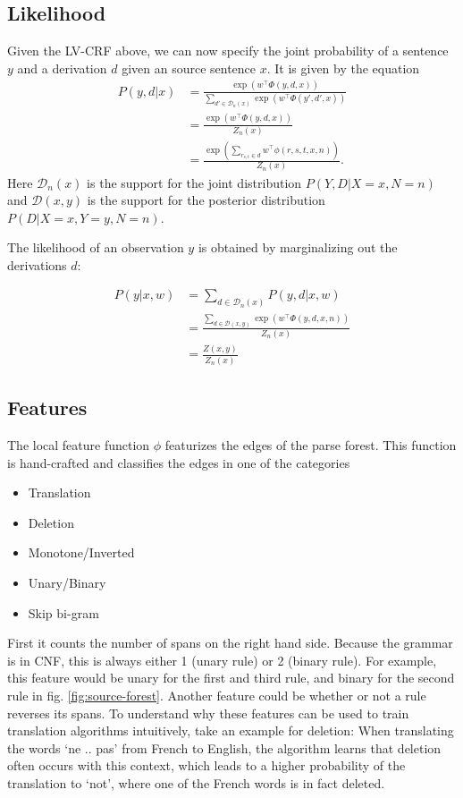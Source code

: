 \documentclass[11pt,a4paper]{article}
\begin{document}
\subsection{Likelihood}
\label{sec:model}

Given the LV-CRF above, we can now specify the joint probability of a sentence $y$ and a derivation $d$ given an source sentence $x$. It is given by the equation
\begin{align*}
\label{eq:likelihood}
P(y,d|x) 
    &= \frac{\exp(w^\top \Phi(y, d, x))}{\sum_{d' \in \mathcal D_n(x)} \exp(w^\top \Phi(y', d', x))}\\
    &= \frac{\exp(w^\top \Phi(y, d, x))}{Z_n(x)} \\
    &= \frac{\exp \left( \sum_{r_{s,t} \in d} w^\top \phi(r, s, t, x, n) \right)}{Z_n(x)}.
\end{align*}
Here $\mathcal{D}_n(x)$ is the support for the joint distribution $P(Y, D|X=x, N=n)$ and $\mathcal{D}(x, y)$ is the support for the posterior distribution $P(D|X=x, Y=y, N=n)$.

The likelihood of an observation $y$ is obtained by marginalizing out the derivations $d$:


\begin{align}
P(y | x, w) 
    &= \sum_{d \in \mathcal{D}_n(x)} P(y, d | x, w) \nonumber  \\
    &= \frac{\sum_{d \in \mathcal D(x, y)} \exp(w^\top \Phi(y, d, x, n))}{Z_n(x)} \nonumber \\
\label{eq:log-likelihood2}
    &= \frac{Z(x, y)}{Z_n(x)}
\end{align}

\subsection{Features}

The local feature function $\phi$ featurizes the edges of the parse forest. This function is hand-crafted and classifies the edges in one of the categories
\begin{itemize}
    \item Translation  
    \item Deletion
    \item Monotone/Inverted
    \item Unary/Binary
    \item Skip bi-gram
\end{itemize}
First it counts the number of spans on the right hand side. Because the grammar is in CNF, this is always either 1 (unary rule) or 2 (binary rule). For example, this feature would be unary for the first and third rule, and binary for the second rule in fig. \ref{fig:source-forest}. Another feature could be whether or not a rule reverses its spans.
To understand why these features can be used to train translation algorithms intuitively, take an example for deletion: When translating the words `ne .. pas' from French to English, the algorithm learns that deletion often occurs with this context, which leads to a higher probability of the translation to `not', where one of the French words is in fact deleted.
\end{document}
